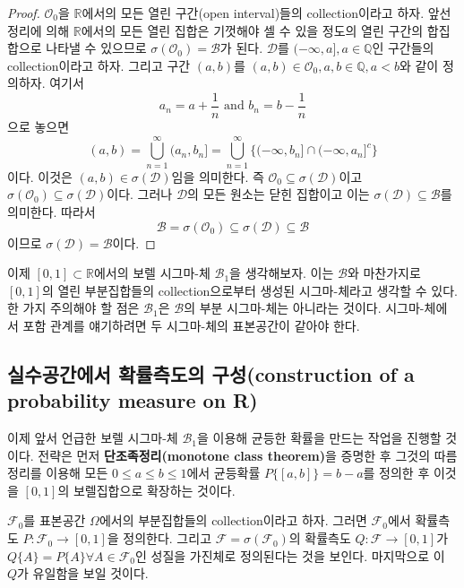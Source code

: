 \documentclass[b5paper,]{scrbook}
\theoremstyle{plain}
\theoremstyle{definition}
\numberwithin{equation}{section}
\let\BeginKnitrBlock\begin \let\EndKnitrBlock\end
\begin{document}
\BeginKnitrBlock{proof}
{}\(\mathcal{O}_{0}\)을 \(\mathbb{R}\)에서의 모든 열린 구간(open interval)들의 collection이라고 하자. 앞선 정리에 의해 \(\mathbb{R}\)에서의 모든 열린 집합은 기껏해야 셀 수 있을 정도의 열린 구간의 합집합으로 나타낼 수 있으므로 \(\sigma(\mathcal{O}_{0})=\mathcal{B}\)가 된다. \(\mathcal{D}\)를 \((-\infty, a], a\in \mathbb{Q}\)인 구간들의 collection이라고 하자. 그리고 구간 \((a,b)\)를 \((a,b)\in \mathcal{O}_{0}, a,b \in \mathbb{Q}, a<b\)와 같이 정의하자. 여기서
\[a_{n}=a+\frac{1}{n} \text{ and } b_{n}=b-\frac{1}{n}\]
으로 놓으면
\[(a,b)=\bigcup_{n=1}^{\infty}(a_{n},b_{n}]=\bigcup_{n=1}^{\infty}\{ (-\infty, b_{n}] \cap (-\infty, a_{n}]^{c}\}\]
이다. 이것은 \((a,b)\in \sigma (\mathcal{D})\)임을 의미한다. 즉 \(\mathcal{O}_{0}\subseteq \sigma(\mathcal{D})\)이고 \(\sigma(\mathcal{O}_{0})\subseteq \sigma(\mathcal{D})\)이다. 그러나 \(\mathcal{D}\)의 모든 원소는 닫힌 집합이고 이는 \(\sigma(\mathcal{D})\subseteq \mathcal{B}\)를 의미한다. 따라서
\[\mathcal{B} = \sigma(\mathcal{O}_{0})\subseteq \sigma(\mathcal{D})\subseteq \mathcal{B}\]
이므로 \(\sigma(\mathcal{D})=\mathcal{B}\)이다.
\EndKnitrBlock{proof}

이제 \([0,1]\subset \mathbb{R}\)에서의 보렐 시그마-체 \(\mathcal{B}_{1}\)을 생각해보자. 이는 \(\mathcal{B}\)와 마찬가지로 \([0,1]\)의 열린 부분집합들의 collection으로부터 생성된 시그마-체라고 생각할 수 있다. 한 가지 주의해야 할 점은 \(\mathcal{B}_{1}\)은 \(\mathcal{B}\)의 부분 시그마-체는 아니라는 것이다. 시그마-체에서 포함 관계를 얘기하려면 두 시그마-체의 표본공간이 같아야 한다.

\hypertarget{--construction-of-a-probability-measure-on-r}{%
\subsection{실수공간에서 확률측도의 구성(construction of a probability measure on R)}\label{--construction-of-a-probability-measure-on-r}}

이제 앞서 언급한 보렐 시그마-체 \(\mathcal{B}_{1}\)을 이용해 균등한 확률을 만드는 작업을 진행할 것이다. 전략은 먼저 \textbf{단조족정리(monotone class theorem)}을 증명한 후 그것의 따름정리를 이용해 모든 \(0\leq a \leq b \leq 1\)에서 균등확률 \(P\{[a,b]\}=b-a\)를 정의한 후 이것을 \([0,1]\)의 보렐집합으로 확장하는 것이다.

\(\mathcal{F}_{0}\)를 표본공간 \(\Omega\)에서의 부분집합들의 collection이라고 하자. 그러면 \(\mathcal{F}_{0}\)에서 확률측도 \(P:\mathcal{F}_{0} \rightarrow [0,1]\)을 정의한다. 그리고 \(\mathcal{F}=\sigma(\mathcal{F}_{0})\)의 확률측도 \(Q:\mathcal{F} \rightarrow [0,1]\)가 \(Q\{A\}=P\{A\} \forall A\in \mathcal{F}_{0}\)인 성질을 가진체로 정의된다는 것을 보인다. 마지막으로 이 \(Q\)가 유일함을 보일 것이다.
\end{document}
